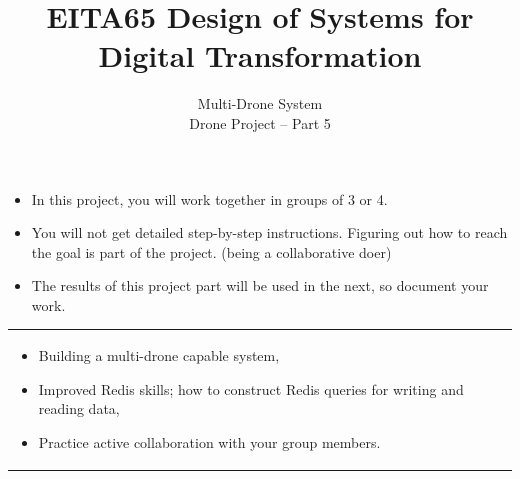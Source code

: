 \documentclass{article}
\title{EITA65 Design of Systems for Digital Transformation\\\year}
\author{\huge Multi-Drone System\\Drone Project -- Part 5}
\begin{document}
\clearpage\maketitle
\thispagestyle{empty}%

\begin{itemize}
\item In this project, you will work together in groups  of 3 or 4.  
\item You will not get detailed step-by-step instructions. Figuring out how to reach the goal is part of the project. (being a collaborative doer)
\item The results of this project part will be used in the next, so document your work.
\end{itemize}

\vspace{.1cm}
\begin{center}
\begin{tabular}{l}
\toprule[1.5pt]
\parbox{0.8\linewidth}{
\vspace{.2cm}{\Large Learning goals:}
\begin{itemize}
    \item Building a multi-drone capable system,
    \item Improved Redis skills; how to construct Redis queries for writing and reading data,
    \item Practice active collaboration with your group members.
\end{itemize}}\\
\bottomrule[1.5pt]
\end{tabular}
\end{center}
\vfill
\vspace{2cm}
\end{document}

